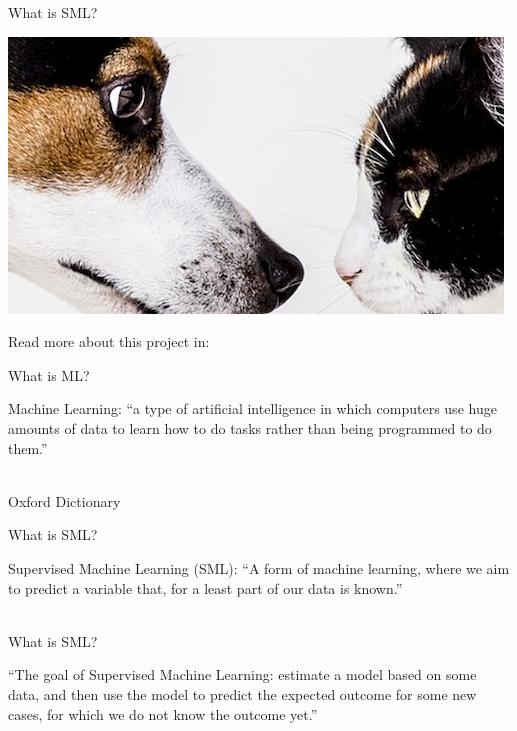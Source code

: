 \documentclass[compress]{beamer}
\begin{document}
\begin{frame}{What is SML?}
	
\begin{center}
	\includegraphics{../pictures/dogvscat.png}
\end{center}
	
\begin{tiny}
	Read more about this project in: 
\end{tiny}
\end{frame}



\begin{frame}{What is ML?} 
	
Machine Learning: “a type of artificial intelligence in which computers use huge amounts of data to learn how to do tasks rather than being programmed to do them.” \\\
	
\begin{tiny}
	Oxford Dictionary
\end{tiny}
	
\end{frame}

\begin{frame}{What is SML?} 
	
Supervised Machine Learning (SML): “A form of machine learning, where we aim to predict a variable that, for a least part of our data is known.” \\\
	
\begin{tiny}
\end{tiny}
\end{frame}


\begin{frame}{What is SML?} 

“The goal of Supervised Machine Learning: estimate a model based on some data, and then use the model to predict the expected outcome for some new cases, for which we do not know the outcome yet.” \\\
	
\begin{tiny}
\end{tiny}
\end{frame}
\end{document}
